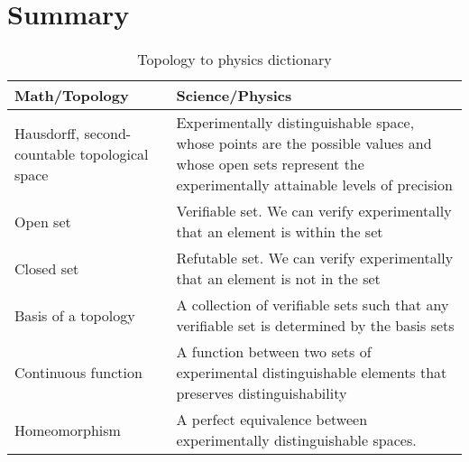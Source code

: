 \documentclass[11pt,letterpaper,fleqn]{memoir} %
\begin{document}
\section{Summary}

\begin{table}[h]
	\centering
\begin{tabular}{p{} p{}}
	Math/Topology & Science/Physics \\ 
	\hline 
	Hausdorff, second-countable topological space & Experimentally distinguishable space, whose points are the possible values and whose open sets represent the experimentally attainable levels of precision \\
	Open set & Verifiable set. We can verify experimentally that an element is within the set  \\ 
	Closed set & Refutable set. We can verify experimentally that an element is not in the set \\ 
	Basis of a topology & A collection of verifiable sets such that any verifiable set is determined by the basis sets\\
	Continuous \newline function &  A function between two sets of experimental distinguishable elements that preserves distinguishability \\
	Homeomorphism &  A perfect equivalence between experimentally distinguishable spaces. \\
\end{tabular} 
\caption{Topology to physics dictionary}
\end{table}

	
\end{document}
